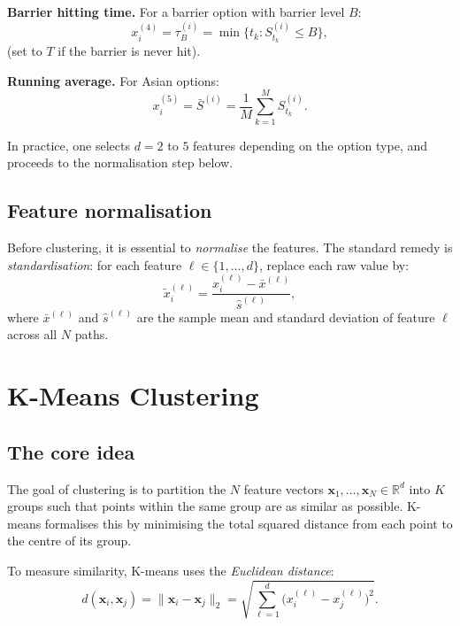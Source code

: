 \documentclass[12pt, a4paper]{report}
\theoremstyle{definition}
\newcommand{\R}{\mathbb{R}}
\begin{document}
\textbf{Barrier hitting time.}  For a barrier option with barrier level
$B$:
\begin{equation}
    x_i^{(4)} = \tau_B^{(i)}
    = \min\bigl\{t_k : S_{t_k}^{(i)} \leq B\bigr\},
    \label{eq:hitting-time}
\end{equation}
(set to $T$ if the barrier is never hit).

\textbf{Running average.}  For Asian options:
\[
    x_i^{(5)} = \bar{S}^{(i)} = \frac{1}{M}\sum_{k=1}^{M} S_{t_k}^{(i)}.
\]

In practice, one selects $d = 2$ to $5$ features depending on the
option type, and proceeds to the normalisation step below.

\subsection{Feature normalisation}

Before clustering, it is essential to \emph{normalise} the features.
The standard remedy is \emph{standardisation}: for each feature
$\ell \in \{1, \ldots, d\}$, replace each raw value by:
\begin{equation}
    \tilde{x}_i^{(\ell)}
    = \frac{x_i^{(\ell)} - \bar{x}^{(\ell)}}{\hat{s}^{(\ell)}},
    \label{eq:standardisation}
\end{equation}
where $\bar{x}^{(\ell)}$ and $\hat{s}^{(\ell)}$ are the sample mean
and standard deviation of feature $\ell$ across all $N$ paths.

\section{K-Means Clustering}
\label{sec:kmeans}

\subsection{The core idea}

The goal of clustering is to partition the $N$ feature vectors
$\mathbf{x}_1, \ldots, \mathbf{x}_N \in \R^d$ into $K$ groups such
that points within the same group are as similar as possible.  K-means
formalises this by minimising the total squared distance from each point
to the centre of its group.

To measure similarity, K-means uses the \emph{Euclidean distance}:
\begin{equation}
    d(\mathbf{x}_i, \mathbf{x}_j)
    = \|\mathbf{x}_i - \mathbf{x}_j\|_2
    = \sqrt{\sum_{\ell=1}^{d}
      \bigl(x_i^{(\ell)} - x_j^{(\ell)}\bigr)^2}.
    \label{eq:euclidean}
\end{equation}
\end{document}
